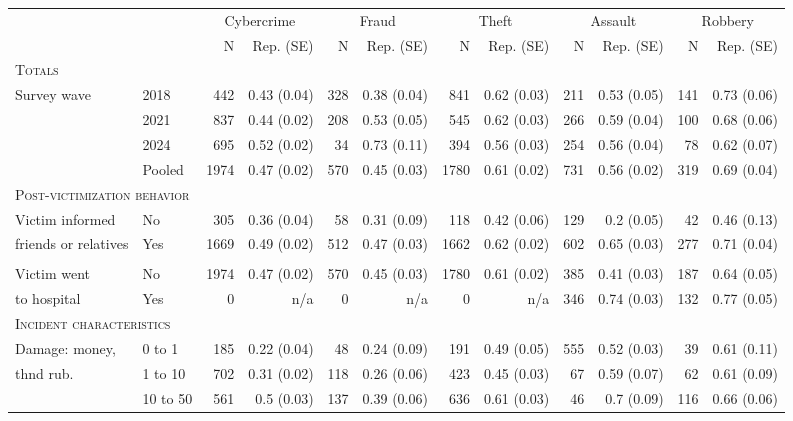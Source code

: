 \begin{tabular}{llrrrrrrrrrr}
	\toprule
	&  & \multicolumn{2}{c}{Cybercrime    } & \multicolumn{2}{c}{Fraud    } & \multicolumn{2}{c}{Theft    } & \multicolumn{2}{c}{Assault    } & \multicolumn{2}{c}{Robbery} \\ 
	\cmidrule(lr){3-4} \cmidrule(lr){5-6} \cmidrule(lr){7-8} \cmidrule(lr){9-10} \cmidrule(lr){11-12}
	&     & N & Rep. (SE) & N  & Rep. (SE)  & N   & Rep. (SE)   & N    & Rep. (SE)    & N     & Rep. (SE)     \\ 
	\multicolumn{12}{l}{\textsc{Totals}} \\
	Survey wave & 2018 & 442 & 0.43 (0.04) & 328 & 0.38 (0.04) & 841 & 0.62 (0.03) & 211 & 0.53 (0.05) & 141 & 0.73 (0.06) \\ 
	& 2021 & 837 & 0.44 (0.02) & 208 & 0.53 (0.05) & 545 & 0.62 (0.03) & 266 & 0.59 (0.04) & 100 & 0.68 (0.06) \\ 
	& 2024 & 695 & 0.52 (0.02) & 34 & 0.73 (0.11) & 394 & 0.56 (0.03) & 254 & 0.56 (0.04) & 78 & 0.62 (0.07) \\ 
	& Pooled & 1974 & 0.47 (0.02) & 570 & 0.45 (0.03) & 1780 & 0.61 (0.02) & 731 & 0.56 (0.02) & 319 & 0.69 (0.04) \\ 
	\midrule
	\multicolumn{12}{l}{\textsc{Post-victimization behavior}} \\
	Victim informed %
	& No & 305 & 0.36 (0.04) & 58 & 0.31 (0.09) & 118 & 0.42 (0.06) & 129 & 0.2 (0.05) & 42 & 0.46 (0.13) \\ 
	friends or relatives  & Yes & 1669 & 0.49 (0.02) & 512 & 0.47 (0.03) & 1662 & 0.62 (0.02) & 602 & 0.65 (0.03) & 277 & 0.71 (0.04) \\ 
	\vspace{1pt}\\
	Victim went & No & 1974 & 0.47 (0.02) & 570 & 0.45 (0.03) & 1780 & 0.61 (0.02) & 385 & 0.41 (0.03) & 187 & 0.64 (0.05) \\ 
	to hospital & Yes & 0 & n/a & 0 & n/a & 0 & n/a & 346 & 0.74 (0.03) & 132 & 0.77 (0.05) \\ 
	\midrule
	\multicolumn{12}{l}{\textsc{Incident characteristics}} \\
	Damage: money,& 0 to 1 & 185 & 0.22 (0.04) & 48 & 0.24 (0.09) & 191 & 0.49 (0.05) & 555 & 0.52 (0.03) & 39 & 0.61 (0.11) \\ 
	thnd rub. & 1 to 10 & 702 & 0.31 (0.02) & 118 & 0.26 (0.06) & 423 & 0.45 (0.03) & 67 & 0.59 (0.07) & 62 & 0.61 (0.09) \\ 
	& 10 to 50 & 561 & 0.5 (0.03) & 137 & 0.39 (0.06) & 636 & 0.61 (0.03) & 46 & 0.7 (0.09) & 116 & 0.66 (0.06) \\ 

\end{tabular}
